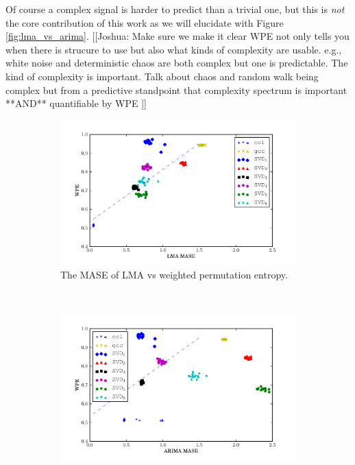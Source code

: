 \documentclass{article}
\begin{document}
Of course a complex signal is harder to predict than a trivial one, but this is \emph{not} the core contribution of this work as we will elucidate with Figure \ref{fig:lma_vs_arima}. [[Joshua: Make sure we make it clear WPE not only tells you when there is strucure to use but also what kinds of complexity are usable. e.g., white noise and deterministic chaos are both complex but one is predictable. The kind of complexity is important. Talk about chaos and random walk being complex but from a predictive standpoint that complexity spectrum is important **AND** quantifiable by WPE ]]
\begin{figure}[htbp]
  \centering
       \caption{
For each of
    these, the word length used is $6$.       
       The MASE values for LMA against ARIMA. The dashed line is the
    identity, delineating the traces for which either LMA or ARIMA performed
   better. All traces except those from {\tt SVD$_1$} lie above the line,
  indicating that LMA is better suited prediction method for the %
   traces considered.}\label{fig:lma_vs_arima}  
  \begin{subfigure}{\textwidth}
    \includegraphics[width=1.0\textwidth]{figs/LMA_prediction_vs_entropy}
    \caption{The MASE of LMA vs weighted permutation entropy. }
    \label{fig:lma_pred_vs_ent}
  \end{subfigure}%
  \\
  \begin{subfigure}{\textwidth}
    \includegraphics[width=1.0\textwidth]{figs/ARIMA_prediction_vs_entropy}

\end{subfigure}
\end{figure}
\end{document}
